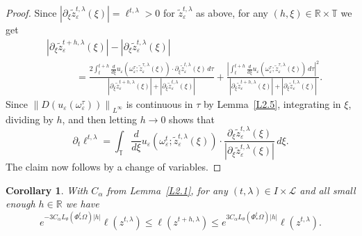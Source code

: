\documentclass[reqno,centertags,12pt]{amsart}
\newtheorem{corollary}[theorem]{Corollary}
\theoremstyle{definition}
\numberwithin{equation}{section}
\newcommand{\abs}[1]{\left\lvert#1\right\rvert}
\newcommand{\norm}[1]{\left\|#1\right\|}
\newcommand{\bbR}{{\mathbb{R}}}
\newcommand{\bbT}{{\mathbb{T}}}
\newcommand{\eps}{\varepsilon}
\newcommand{\tht}{\theta}
\begin{document}
\begin{proof}
    Since $\abs{\partial_{\xi}\tilde{z}_{\eps}^{t,\lambda}(\xi)}
    = \ell^{t,\lambda}> 0$ for $\tilde{z}_{\eps}^{t,\lambda}$ as above, for any $(h,\xi)\in\bbR\times\bbT$ we get
    \begin{equation*}
        \begin{aligned}
            &\abs{\partial_{\xi}\tilde{z}_{\eps}^{t+h,\lambda}(\xi)}
            - \abs{\partial_{\xi}\tilde{z}_{\eps}^{t,\lambda}(\xi)}
            \\&\quad\quad\quad
            = \frac{2\int_{t}^{t+h} \frac d{d\xi} u_{\eps}(\omega_{\eps}^{\tau};
            \tilde{z}_{\eps}^{\tau,\lambda}(\xi))
            \cdot \partial_{\xi}\tilde{z}_{\eps}^{t,\lambda}(\xi)\,d\tau}
            {\abs{\partial_{\xi}\tilde{z}_{\eps}^{t+h,\lambda}(\xi)}
            + \abs{\partial_{\xi}\tilde{z}_{\eps}^{t,\lambda}(\xi)}}
            + \frac{\abs{\int_{t}^{t+h} \frac d{d\xi} u_{\eps}(\omega_{\eps}^{\tau};
            \tilde{z}_{\eps}^{\tau,\lambda}(\xi))\,d\tau}^{2}}
            {\abs{\partial_{\xi}\tilde{z}_{\eps}^{t+h,\lambda}(\xi)}
            + \abs{\partial_{\xi}\tilde{z}_{\eps}^{t,\lambda}(\xi)}}.
        \end{aligned}
    \end{equation*}
    Since $\norm{D(u_{\eps}(\omega_{\eps}^{\tau}))}_{L^{\infty}}$ is continuous in $\tau$
    by Lemma~\ref{L2.5}, integrating in $\xi$, dividing by $h$,
    and then letting $h\to 0$ shows that
    \[
        \partial_{t}\ell^{t,\lambda}
        = \int_{\bbT}
        \frac d{d\xi} u_{\eps}(\omega_{\eps}^{t};\tilde{z}_{\eps}^{t,\lambda}(\xi))
        \cdot \frac{\partial_{\xi}\tilde{z}_{\eps}^{t,\lambda}(\xi)}
        {\abs{\partial_{\xi}\tilde{z}_{\eps}^{t,\lambda}(\xi)}}\,d\xi.
    \]
    The claim now follows by a change of variables.
\end{proof}

\begin{corollary}\label{C3.2}
    With $C_{\alpha}$ from Lemma~\ref{L2.1}, for any $(t,\lambda)\in I\times\mathcal{L}$ and all small enough $h\in\bbR$ we have
    \[
        e^{-3C_{\alpha}L_{\tht}(\Phi_{*}^{t}\Omega)\abs{h}}\ell(z^{t,\lambda})
        \leq \ell(z^{t+h,\lambda}) \leq
        e^{3C_{\alpha}L_{\tht}(\Phi_{*}^{t}\Omega)\abs{h}}\ell(z^{t,\lambda}).
    \]
\end{corollary}
\end{document}
